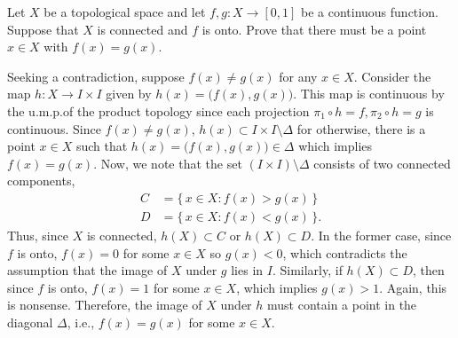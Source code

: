 \begin{problem}
  Let \(X\) be a topological space and let \(f,g\colon X\to[0,1]\) be a
  continuous function. Suppose that \(X\) is connected and \(f\) is
  onto. Prove that there must be a point \(x\in X\) with \(f(x)=g(x)\).
\end{problem}
\begin{solution}
  Seeking a contradiction, suppose \(f(x)\neq g(x)\) for any \(x\in
  X\). Consider the map \(h\colon X\to I\times I\) given by
  \(h(x)=\bigl(f(x),g(x)\bigr)\). This map is continuous by the u.m.p.\@ of
  the product topology since each projection
  \(\pi_1\circ h=f,\pi_2\circ h=g\) is continuous. Since \(f(x)\neq g(x)\),
  \(h(x)\subset I\times I\setminus\Delta\) for otherwise, there is a
  point \(x\in X\) such that \(h(x)=\bigl(f(x),g(x)\bigr)\in\Delta\) which
  implies \(f(x)=g(x)\). Now, we note that the set
  \((I\times I)\setminus\Delta\) consists of two connected components,
  \begin{align*}
    C&=\bigl\{\,x\in X:f(x)>g(x)\,\bigr\}\\
    D&=\bigl\{\,x\in X:f(x)<g(x)\,\bigr\}.
  \end{align*}
  Thus, since \(X\) is connected, \(h(X)\subset C\) or \(h(X)\subset
  D\). In the former case, since \(f\) is onto, \(f(x)=0\) for some \(x\in
  X\) so \(g(x)<0\), which contradicts the assumption that the image of
  \(X\) under \(g\) lies in \(I\). Similarly, if \(h(X)\subset D\), then
  since \(f\) is onto, \(f(x)=1\) for some \(x\in X\), which implies
  \(g(x)>1\). Again, this is nonsense. Therefore, the image of \(X\) under
  \(h\) must contain a point in the diagonal \(\Delta\), i.e.,
  \(f(x)=g(x)\) for some \(x\in X\).
\end{solution}

